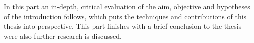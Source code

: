 \chapter*{}

In this part an in-depth, critical evaluation of the aim, objective and hypotheses of the introduction follows, which puts the techniques and contributions of this thesis into perspective. This part finishes with a brief conclusion to the thesis were also further research is discussed.




